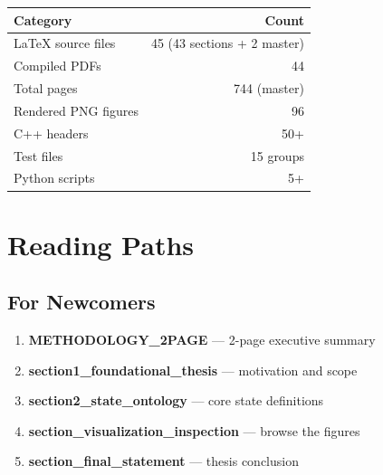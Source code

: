 \documentclass[11pt, letterpaper]{article}
\begin{document}
\begin{center}
\renewcommand{\arraystretch}{1.2}
\begin{tabular}{lr}
\toprule
\textbf{Category} & \textbf{Count} \\
\midrule
LaTeX source files     & 45 (43 sections + 2 master) \\
Compiled PDFs          & 44 \\
Total pages            & 744 (master) \\
Rendered PNG figures   & 96 \\
C++ headers            & 50+ \\
Test files             & 15 groups \\
Python scripts         & 5+ \\
\bottomrule
\end{tabular}
\end{center}


\section{Reading Paths}

\subsection{For Newcomers}
\begin{enumerate}
\item \textbf{METHODOLOGY\_2PAGE} --- 2-page executive summary
\item \textbf{section1\_foundational\_thesis} --- motivation and scope
\item \textbf{section2\_state\_ontology} --- core state definitions
\item \textbf{section\_visualization\_inspection} --- browse the figures
\item \textbf{section\_final\_statement} --- thesis conclusion
\end{enumerate}
\end{document}
